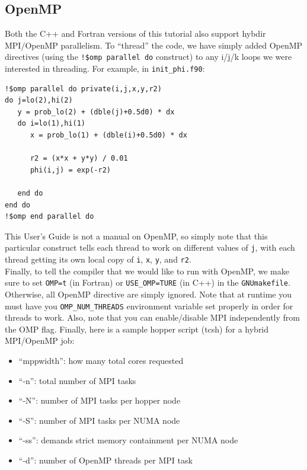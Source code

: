 \subsection{OpenMP}\label{Sec:OpenMP}
Both the C++ and Fortran versions of this tutorial also support hybdir MPI/OpenMP parallelism.
To ``thread'' the code, we have simply added OpenMP directives (using the {\tt !\$omp parallel do} 
construct) to any i/j/k loops we were interested in threading.  For example, in {\tt init\_phi.f90}:
\begin{lstlisting}[backgroundcolor=\color{light-green}]
!$omp parallel do private(i,j,x,y,r2)
do j=lo(2),hi(2)
   y = prob_lo(2) + (dble(j)+0.5d0) * dx
   do i=lo(1),hi(1)
      x = prob_lo(1) + (dble(i)+0.5d0) * dx

      r2 = (x*x + y*y) / 0.01
      phi(i,j) = exp(-r2)

   end do
end do
!$omp end parallel do
\end{lstlisting}
This User's Guide is not a manual on OpenMP, so simply note that this particular 
construct tells each thread to work on different values of {\tt j}, with each 
thread getting its own local copy of {\tt i}, {\tt x}, {\tt y}, and {\tt r2}.\\

Finally, to tell the compiler that we would like to run with OpenMP, we make sure to
set {\tt OMP=t} (in Fortran) or {\tt USE\_OMP=TURE} (in C++) in the {\tt GNUmakefile}.
Otherwise, all OpenMP directive are
simply ignored.  Note that at runtime you must have you 
{\tt OMP\_NUM\_THREADS} environment variable set properly in order for threads to work.
Also, note that you can enable/disable MPI independently from the OMP flag.  Finally,
here is a sample hopper script (tcsh) for a hybrid MPI/OpenMP job:

\begin{itemize}
\item ``mppwidth'': how many total cores requested
\item ``-n'': total number of MPI tasks
\item ``-N'': number of MPI tasks per hopper node
\item ``-S'': number of MPI tasks per NUMA node
\item ``-ss'': demands strict memory containment per NUMA node
\item ``-d'': number of OpenMP threads per MPI task
\end{itemize}
